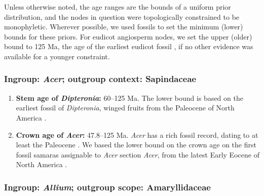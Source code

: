 
Unless otherwise noted, the age ranges are the bounds of a uniform
prior distribution, and the nodes in question were topologically
constrained to be monophyletic. Wherever possible, we used fossils to
set the minimum (lower) bounds for these priors. For eudicot
angiosperm nodes, we set the upper (older) bound to 125 Ma, the age of
the earliest eudicot fossil \citep{Hughes1994}, if no other evidence
was available for a younger constraint.

\subsubsection*{Ingroup: \textit{Acer}; outgroup context: Sapindaceae}


\begin{enumerate}

\item \textbf{Stem age of \textit{Dipteronia}:} 60--125 Ma. The
  lower bound is based on the earliest fossil of
  \textit{Dipteronia}, winged fruits from the Paleocene of North
  America \citep{McClain2001}.

\item \textbf{Crown age of \textit{Acer}:} 47.8--125 Ma. \textit{Acer}
  has a rich fossil record, dating to at least the Paleocene
  \citep{Wolfe1987,Mai1995}. We based the lower bound on the crown age
  on the first fossil samaras assignable to \textit{Acer} section
  \textit{Acer}, from the latest Early Eocene of North America
  \citep{Wolfe1987}.

\end{enumerate}

\subsubsection*{Ingroup: \textit{Allium}; outgroup scope:
  Amaryllidaceae}




